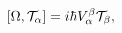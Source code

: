 \begin{equation}
\lbrack\Omega,{\cal T}_{\alpha}]=i\hbar V_{\alpha}^{\beta}{\cal T}%
_{\beta},\label{3.5}%
\end{equation}


